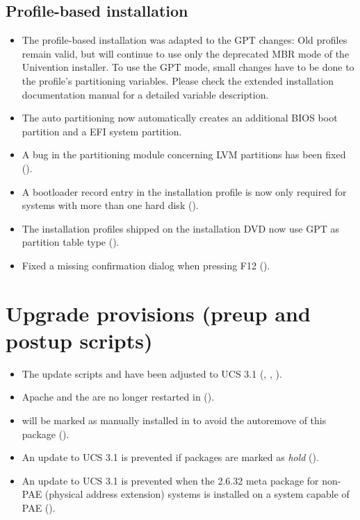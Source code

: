 \subsection{Profile-based installation}
\begin{itemize}
\item The profile-based installation was adapted to the GPT changes:
  Old profiles remain valid, but will continue to use only the
  deprecated MBR mode of the Univention installer. To use the GPT
  mode, small changes have to be done to the profile's partitioning
  variables. Please check the extended installation documentation
  manual for a detailed variable description.
\item The auto partitioning now automatically creates an additional
  BIOS boot partition and a EFI system partition.

\item A bug in the partitioning module concerning LVM partitions has
  been fixed ().

\item A bootloader record entry in the installation profile is now only
required for systems with more than one hard disk ().

\item The installation profiles shipped on the installation DVD now
  use GPT as partition table type ().

\item Fixed a missing confirmation dialog when pressing F12 ().

\end{itemize}


\section{Upgrade provisions (preup and postup scripts)}

\begin{itemize}
\item The update scripts  and 
  have been adjusted to UCS 3.1 (, , ).

\item Apache and the \ucsUMC{} are no longer restarted in
   ().

\item {} will be marked as
  manually installed in  to avoid the autoremove of
  this package ().

\item An update to UCS 3.1 is prevented if packages are marked as
  \emph{hold} ().

\item An update to UCS 3.1 is prevented when the 2.6.32 meta package for
  non-PAE (physical address extension) systems is installed on a system capable of PAE ().

\end{itemize}





